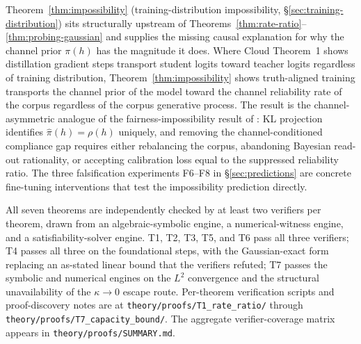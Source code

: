 \documentclass[11pt]{article}
\theoremstyle{definition}
\theoremstyle{remark}
\begin{document}
Theorem~\ref{thm:impossibility} (training-distribution impossibility, \S\ref{sec:training-distribution})
sits structurally upstream of Theorems~\ref{thm:rate-ratio}--\ref{thm:probing-gaussian}
and supplies the missing causal explanation for why the channel prior $\pi(h)$ has
the magnitude it does. Where Cloud Theorem~1 \cite{cloud2026subliminal} shows
distillation gradient steps transport student logits toward teacher logits regardless
of training distribution, Theorem~\ref{thm:impossibility} shows truth-aligned training
transports the channel prior of the model toward the channel reliability rate of the
corpus regardless of the corpus generative process. The result is the channel-asymmetric
analogue of the fairness-impossibility result of \cite{hardt2016fairness}: KL projection
identifies $\hat\pi(h) = \rho(h)$ uniquely, and removing the channel-conditioned compliance
gap requires either rebalancing the corpus, abandoning Bayesian read-out rationality, or
accepting calibration loss equal to the suppressed reliability ratio. The three
falsification experiments F6--F8 in \S\ref{sec:predictions} are concrete fine-tuning
interventions that test the impossibility prediction directly.

All seven theorems are independently checked by at least two verifiers per theorem,
drawn from an algebraic-symbolic engine, a numerical-witness engine, and a
satisfiability-solver engine. T1, T2, T3, T5, and T6 pass all three verifiers;
T4 passes all three on the foundational steps, with the Gaussian-exact form
replacing an as-stated linear bound that the verifiers refuted; T7 passes the
symbolic and numerical engines on the $L^2$ convergence and the structural
unavailability of the $\kappa \to 0$ escape route. Per-theorem verification
scripts and proof-discovery notes are at \texttt{theory/proofs/T1\_rate\_ratio/}
through \texttt{theory/proofs/T7\_capacity\_bound/}. The aggregate
verifier-coverage matrix appears in \texttt{theory/proofs/SUMMARY.md}.



\end{document}
